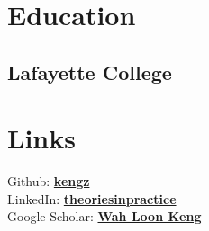 \documentclass{deedy-resume-openfont}
\begin{document}
%
%
\lastupdated

%
%

%
%

\begin{minipage}[t]{0.33\textwidth}


\section{Education}

\subsection{Lafayette College}
\sectionsep



\section{Links}
Github: \href{https://github.com/kengz}{\bf kengz} \\
LinkedIn:  \href{https://www.linkedin.com/in/theoriesinpractice}{\bf theoriesinpractice} \\
Google Scholar: \href{https://scholar.google.com/citations?user=J0aM_cEAAAAJ&hl=en}{\bf Wah Loon Keng}
\sectionsep



\end{minipage}
\end{document}
